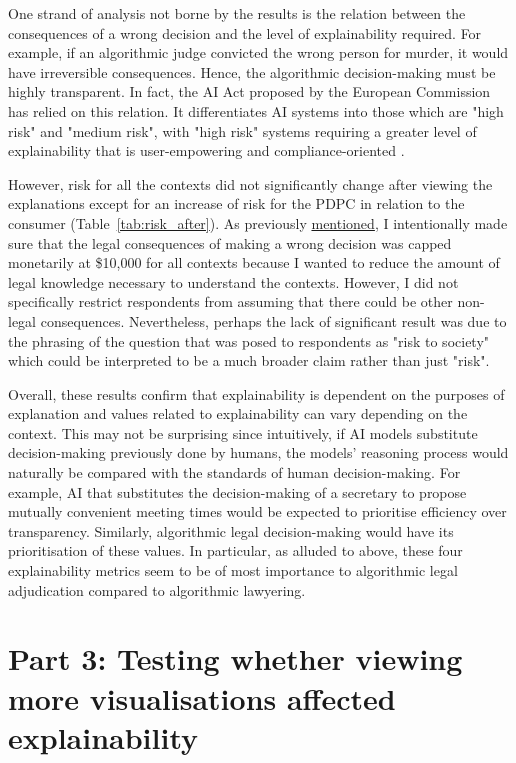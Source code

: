 One strand of analysis not borne by the results is the relation between the consequences of a wrong decision and the level of explainability required. For example, if an algorithmic judge convicted the wrong person for murder, it would have irreversible consequences. Hence, the algorithmic decision-making must be highly transparent. In fact, the AI Act proposed by the European Commission has relied on this relation. It differentiates AI systems into those which are "high risk" and "medium risk", with "high risk" systems requiring a greater level of explainability that is user-empowering and compliance-oriented \cite{sovrano2022metrics}.

However, risk for all the contexts did not significantly change after viewing the explanations except for an increase of risk for the PDPC in relation to the consumer (Table~\ref{tab:risk_after}). As previously \hyperref[sec:survey_method]{mentioned}, I intentionally made sure that the legal consequences of making a wrong decision was capped monetarily at \$10,000 for all contexts because I wanted to reduce the amount of legal knowledge necessary to understand the contexts. However, I did not specifically restrict respondents from assuming that there could be other non-legal consequences. Nevertheless, perhaps the lack of significant result was due to the phrasing of the question that was posed to respondents as "risk to society" which could be interpreted to be a much broader claim rather than just "risk".

Overall, these results confirm that explainability is dependent on the purposes of explanation and values related to explainability can vary depending on the context. This may not be surprising since intuitively, if AI models substitute decision-making previously done by humans, the models' reasoning process would naturally be compared with the standards of human decision-making. For example, AI that substitutes the decision-making of a secretary to propose mutually convenient meeting times would be expected to prioritise efficiency over transparency. Similarly, algorithmic legal decision-making would have its prioritisation of these values. In particular, as alluded to above, these four explainability metrics seem to be of most importance to algorithmic legal adjudication compared to algorithmic lawyering.

\section{Part 3: Testing whether viewing more visualisations affected explainability}
